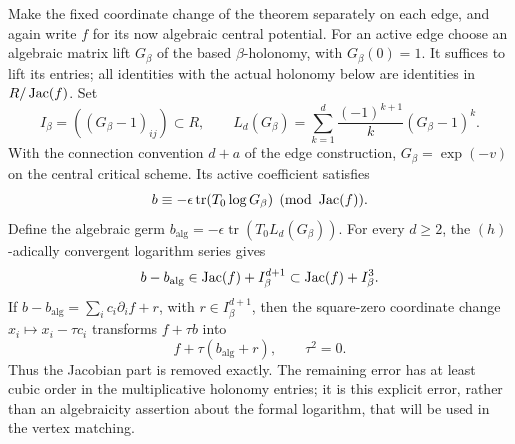 Make the fixed coordinate change of the theorem separately on each
edge, and again write \(f\) for its now algebraic central potential.
For an active edge choose an algebraic matrix lift \(G_\beta\) of
the based \(\beta\)-holonomy, with \(G_\beta(0)=1\).  It suffices to
lift its entries; all identities with the actual holonomy below are
identities in \(R/\operatorname{Jac}(f)\).  Set
\[
 I_\beta=((G_\beta-1)_{ij})\subset R,
 \qquad
 L_d(G_\beta)=\sum_{k=1}^{d}\frac{(-1)^{k+1}}{k}(G_\beta-1)^k.
\]
With the connection convention \(d+a\) of the edge construction,
\(G_\beta=\exp(-v)\) on the central critical scheme.  Its active
coefficient satisfies
\[
             b\equiv-\epsilon\operatorname{tr}
                           (T_0\log G_\beta)\pmod{\operatorname{Jac}(f)}.
\]
Define the algebraic germ
\(b_{\mathrm{alg}}=-\epsilon\operatorname{tr}(T_0 L_d(G_\beta))\).
For every \(d\geq2\), the \((h)\)-adically convergent logarithm series gives
\begin{equation}
\label{eq:polynomial-log-error}
             b-b_{\mathrm{alg}}\in\operatorname{Jac}(f)+I_\beta^{d+1}
                                      \subset\operatorname{Jac}(f)+I_\beta^3.
\end{equation}
If \(b-b_{\mathrm{alg}}=\sum_i c_i\partial_i f+r\), with
\(r\in I_\beta^{d+1}\), then the square-zero coordinate change
\(x_i\mapsto x_i-\tau c_i\) transforms
\(f+\tau b\) into
\[
                         f+\tau(b_{\mathrm{alg}}+r),
                         \qquad \tau^2=0.
\]
Thus the Jacobian part is removed exactly.  The remaining error has
at least cubic order in the multiplicative holonomy entries; it is
this explicit error, rather than an algebraicity assertion about the
formal logarithm, that will be used in the vertex matching.
